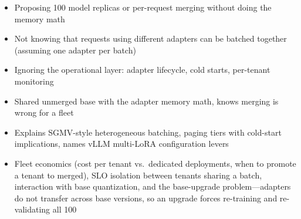 \begin{interviewq}
\redflags
\begin{itemize}
    \item Proposing 100 model replicas or per-request merging without doing the memory math
    \item Not knowing that requests using different adapters can be batched together (assuming one adapter per batch)
    \item Ignoring the operational layer: adapter lifecycle, cold starts, per-tenant monitoring
\end{itemize}


\goodgreat
\begin{itemize}
    \item {} Shared unmerged base with the adapter memory math, knows merging is wrong for a fleet
    \item {} Explains SGMV-style heterogeneous batching, paging tiers with cold-start implications, names vLLM multi-LoRA configuration levers
    \item {} Fleet economics (cost per tenant vs.\ dedicated deployments, when to promote a tenant to merged), SLO isolation between tenants sharing a batch, interaction with base quantization, and the base-upgrade problem---adapters do not transfer across base versions, so an upgrade forces re-training and re-validating all 100
\end{itemize}

\end{interviewq}